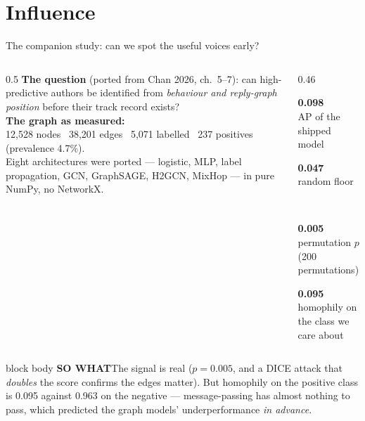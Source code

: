 \documentclass[aspectratio=169,11pt]{beamer}
\newcommand{\sowhatfont}{\footnotesize}
\newcommand{\sowhat}[1]{%
  \vspace{0.3em}
  \begin{beamercolorbox}[wd=\linewidth,sep=0.55em]{block body}
    {\sowhatfont\textbf{\color{gicnavy}SO WHAT}\quad #1}
  \end{beamercolorbox}}
\newcommand{\stat}[3][0.235]{%
  \begin{minipage}[t]{#1\linewidth}
    {\color{gicnavy}\fontsize{22}{24}\selectfont\bfseries #2}\\[0.15em]
    {\color{giclight}\scriptsize #3}
  \end{minipage}}
\begin{document}
\section{Influence}
\begin{frame}{The companion study: can we spot the useful voices early?}
  \begin{columns}[T]
    \begin{column}{0.5\linewidth}
      \footnotesize
      \textbf{The question} (ported from Chan 2026, ch.\ 5--7): can
      high-predictive authors be identified from \emph{behaviour and
      reply-graph position} before their track record exists?
      \vspace{0.5em}
      \\ \textbf{The graph as measured:}
      \\ 12{,}528 nodes \textbullet\ 38{,}201 edges \textbullet\ 5{,}071
      labelled \textbullet\ 237 positives (prevalence 4.7\%).
      \vspace{0.5em}
      \\ Eight architectures were ported --- logistic, MLP, label propagation,
      GCN, GraphSAGE, H2GCN, MixHop --- in pure NumPy, no NetworkX.
    \end{column}
    \begin{column}{0.46\linewidth}
      \vspace{0.2em}
      \stat[0.46]{0.098}{AP of the shipped model}\hfill
      \stat[0.46]{0.047}{random floor}\\[1.1em]
      \stat[0.46]{0.005}{permutation $p$ (200 permutations)}\hfill
      \stat[0.46]{0.095}{homophily on the class we care about}
    \end{column}
  \end{columns}
  \sowhat{The signal is real ($p=0.005$, and a DICE attack that
    \emph{doubles} the score confirms the edges matter). But homophily on the
    positive class is 0.095 against 0.963 on the negative --- message-passing
    has almost nothing to pass, which predicted the graph models'
    underperformance \emph{in advance}.}
\end{frame}
\end{document}
